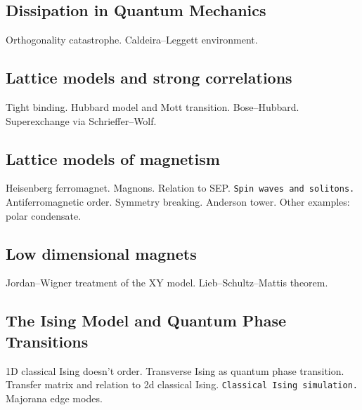 \subsection{Dissipation in Quantum Mechanics}

Orthogonality catastrophe. Caldeira--Leggett environment.

\subsection{Lattice models and strong correlations}

Tight binding. Hubbard model and Mott transition. Bose--Hubbard. Superexchange via Schrieffer--Wolf.

\subsection{Lattice models of magnetism}

Heisenberg ferromagnet. Magnons. Relation to SEP. \verb|Spin waves and solitons.|
Antiferromagnetic order. Symmetry breaking. Anderson tower. Other examples: polar condensate.

\subsection{Low dimensional magnets}

Jordan--Wigner treatment of the XY model. Lieb--Schultz--Mattis theorem.

\subsection{The Ising Model and Quantum Phase Transitions}

1D classical Ising doesn't order. Transverse Ising as quantum phase transition. Transfer matrix and relation to 2d classical Ising. \verb|Classical Ising simulation.| Majorana edge modes.









